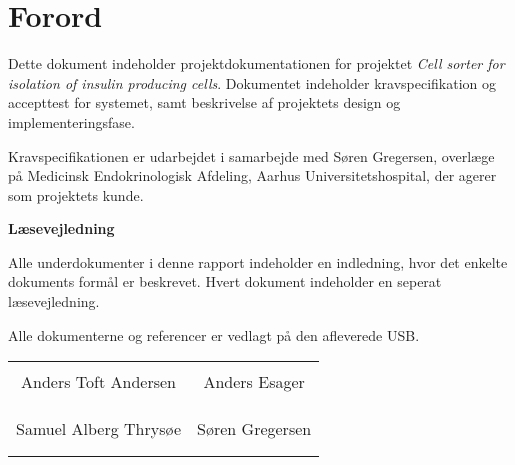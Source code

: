 \chapter*{Forord}

Dette dokument indeholder projektdokumentationen for projektet \textit{Cell sorter for isolation of insulin producing cells}. Dokumentet indeholder kravspecifikation og accepttest for systemet, samt beskrivelse af projektets design og implementeringsfase. 

Kravspecifikationen er udarbejdet i samarbejde med Søren Gregersen, overlæge på Medicinsk Endokrinologisk Afdeling, Aarhus Universitetshospital, der agerer som projektets kunde. 

\textbf{Læsevejledning}

Alle underdokumenter i denne rapport indeholder en indledning, hvor det enkelte dokuments formål er beskrevet. Hvert dokument indeholder en seperat læsevejledning.


Alle dokumenterne og referencer er vedlagt på den afleverede USB.

\phantom{Luft}

\phantom{Luft}

\begin{table}[H]
	\centering
		\begin{tabular}{c c}
			\underline{\phantom{mmmmmmmmmmmmmm}} & \underline{\phantom{mmmmmmmmmmmmmm}}  \\
			Anders Toft Andersen			& Anders Esager		 			\\
			&\\
			&\\
			\underline{\phantom{mmmmmmmmmmmmmm}} & \underline{\phantom{mmmmmmmmmmmmmm}}  \\
			Samuel Alberg Thrysøe			& Søren Gregersen 						\\
			&\\
			&\\
		 																									
		\end{tabular}
\end{table}